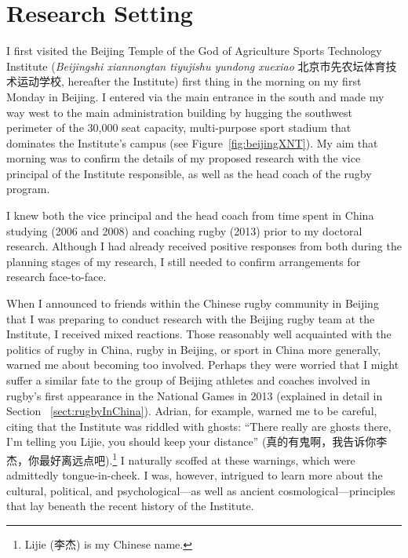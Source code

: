 
\begin{savequote}[8cm]

  \qauthor{}
\end{savequote}


\chapter{\label{chap:researchSetting}Research Setting}


\minitoc




                                  \begin{CJK}{UTF8}{gbsn}


I first visited the Beijing Temple of the God of Agriculture Sports Technology Institute (\textit{Beijingshi xiannongtan tiyujishu yundong xuexiao} 北京市先农坛体育技术运动学校,
hereafter the Institute) first thing in the morning on my first Monday in Beijing.  I entered via the main entrance in the south and made my way west to the main administration building by hugging the southwest perimeter of the 30,000 seat capacity, multi-purpose sport stadium that dominates the Institute's campus (see Figure~\ref{fig:beijingXNT}). My aim that morning was to confirm the details of my proposed research with the vice principal of the Institute responsible, as well as the head coach of the rugby program.

I knew both the vice principal and the head coach from time spent in China studying (2006 and 2008) and coaching rugby (2013) prior to my doctoral research.  Although I had already received positive responses from both during the planning stages of my research, I still needed to confirm arrangements for research face-to-face.

When I announced to friends within the Chinese rugby community in Beijing that I was preparing to conduct research with the Beijing rugby team at the Institute, I received mixed reactions.  Those reasonably well acquainted with the politics of rugby in China, rugby in Beijing, or sport in China more generally, warned me about becoming too involved.  Perhaps they were worried that I might suffer a similar fate to the group of Beijing athletes and coaches involved in rugby's first appearance in the National Games in 2013 (explained in detail in Section ~\ref{sect:rugbyInChina}).  Adrian, for example, warned me to be careful, citing that the Institute was riddled with ghosts: ``There really are ghosts there, I'm telling you Lijie, you should keep your distance'' (真的有鬼啊，我告诉你李杰，你最好离远点吧).\footnote{Lijie (李杰) is my Chinese name.}  I naturally scoffed at these warnings, which were admittedly tongue-in-cheek.  I was, however, intrigued to learn more about the cultural, political, and psychological---as well as ancient cosmological---principles that lay beneath the recent history of the Institute.


\end{CJK}
